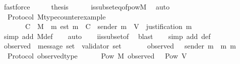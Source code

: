 \begin{isabellebody}
\ fastforce\isanewline
\ \ \isamarkupfalse%
\ \isamarkupfalse%
\ {\isacharquery}thesis\isanewline
\ \ \ \ \isamarkupfalse%
\ {\isasymSigma}{\isacharunderscore}is{\isacharunderscore}subseteq{\isacharunderscore}of{\isacharunderscore}pow{\isacharunderscore}M\ \isamarkupfalse%
\ auto\isanewline
{}\isamarkupfalse%
%
\endisatagproof
{\isafoldproof}%
%
\isadelimproof
\isanewline
%
\endisadelimproof
\isanewline
\isanewline
{}\isamarkupfalse%
\ {\isacharparenleft}\ Protocol{\isacharparenright}\ M{\isacharunderscore}type{\isacharunderscore}counterexample{\isacharcolon}\ \isanewline
\ \ {\isachardoublequoteopen}{\isacharparenleft}{\isasymforall}\ {\isasymsigma}{\isachardot}\ {\isasymepsilon}\ {\isasymsigma}\ {\isacharequal}\ C{\isacharparenright}\ {\isasymLongrightarrow}\ M\ {\isacharequal}\ {\isacharbraceleft}m{\isachardot}\ est\ m\ {\isasymin}\ C\ {\isasymand}\ sender\ m\ {\isasymin}\ V\ {\isasymand}\ justification\ m\ {\isasymin}\ {\isasymSigma}{\isacharbraceright}{\isachardoublequoteclose}\isanewline
%
\isadelimproof
\ \ %
\endisadelimproof
%
\isatagproof
{}\isamarkupfalse%
\ {\isacharparenleft}simp\ add{\isacharcolon}\ M{\isacharunderscore}def{\isacharparenright}\isanewline
\ \ \isamarkupfalse%
\ auto\isanewline
\ \ \isamarkupfalse%
\ {\isasymSigma}i{\isacharunderscore}is{\isacharunderscore}subset{\isacharunderscore}of{\isacharunderscore}{\isasymSigma}\ \isamarkupfalse%
\ blast\isanewline
\ \ \isamarkupfalse%
\ {\isacharparenleft}simp\ add{\isacharcolon}\ {\isasymSigma}{\isacharunderscore}def{\isacharparenright}%
\endisatagproof
{\isafoldproof}%
%
\isadelimproof
\ \isanewline
%
\endisadelimproof
\isanewline
\isanewline
{}\isamarkupfalse%
\ observed\ {\isacharcolon}{\isacharcolon}\ {\isachardoublequoteopen}message\ set\ {\isasymRightarrow}\ validator\ set{\isachardoublequoteclose}\isanewline
\ \ \isanewline
\ \ \ \ {\isachardoublequoteopen}observed\ {\isasymsigma}\ {\isacharequal}\ {\isacharbraceleft}sender\ m\ {\isacharbar}\ m{\isachardot}\ m\ {\isasymin}\ {\isasymsigma}{\isacharbraceright}{\isachardoublequoteclose}\isanewline
\isanewline
{}\isamarkupfalse%
\ {\isacharparenleft}\ Protocol{\isacharparenright}\ observed{\isacharunderscore}type\ {\isacharcolon}\isanewline
\ \ {\isachardoublequoteopen}{\isasymforall}\ {\isasymsigma}\ {\isasymin}\ Pow\ M{\isachardot}\ observed\ {\isasymsigma}\ {\isasymin}\ Pow\ V{\isachardoublequoteclose}\isanewline

\end{isabellebody}
